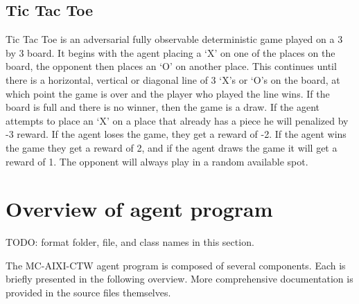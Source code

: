 \documentclass{article}
\theoremstyle{definition}
\newtheorem{primary statistics}[definition]{Primary Statistics}
\newtheorem{auxiliary statistics}[definition]{Auxiliary Statistics}
\begin{document}
\subsection{Tic Tac Toe}
Tic Tac Toe is an adversarial fully observable deterministic game played on a 3 by 3 board. It begins with the agent placing a ‘X’ on one of the places on the board, the opponent then places an ‘O’ on another place. This continues until there is a horizontal, vertical or diagonal line of 3 ‘X’s or ‘O’s on the board, at which point the game is over and the player who played the line wins. If the board is full and there is no winner, then the game is a draw. If the agent attempts to place an ‘X’ on a place that already has a piece he will penalized by -3 reward. If the agent loses the game, they get a reward of -2. If the agent wins the game they get a reward of 2, and if the agent draws the game it will get a reward of 1. The opponent will always play in a random available spot.


\section{Overview of agent program}
TODO: format folder, file, and class names in this section.

The MC-AIXI-CTW agent program is composed of several components. Each is briefly presented in the following overview. More comprehensive documentation is provided in the source files themselves.





\end{document}
